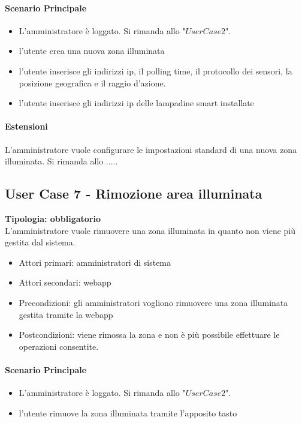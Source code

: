 \documentclass[12pt]{article}
\begin{document}
\paragraph{Scenario Principale}
\begin{itemize}
	\item L'amministratore è loggato. Si rimanda allo "$User Case 2$".
	\item l'utente crea una nuova zona illuminata
	\item l'utente inserisce gli indirizzi ip, il polling time, il protocollo dei sensori, la posizione geografica e il raggio d'azione.
	\item l'utente inserisce gli indirizzi ip delle lampadine smart installate
\end{itemize}

\paragraph{Estensioni} L'amministratore vuole configurare le impostazioni standard di una nuova zona illuminata. Si rimanda allo .....

\subsection{User Case 7 - Rimozione area illuminata}
\textbf{Tipologia: obbligatorio} \\
L'amministratore vuole rimuovere una zona illuminata in quanto non viene più gestita dal sistema.
\begin{itemize}
	\item Attori primari: amministratori di sistema
	\item Attori secondari: webapp
	\item Precondizioni: gli amministratori vogliono rimuovere una zona illuminata gestita tramite la webapp
	\item Postcondizioni: viene rimossa la zona e non è più possibile effettuare le operazioni consentite.
\end{itemize}
\paragraph{Scenario Principale}
\begin{itemize}
	\item L'amministratore è loggato. Si rimanda allo "$User Case 2$".
	\item l'utente rimuove la zona illuminata tramite l'apposito tasto
\end{itemize}
\end{document}
